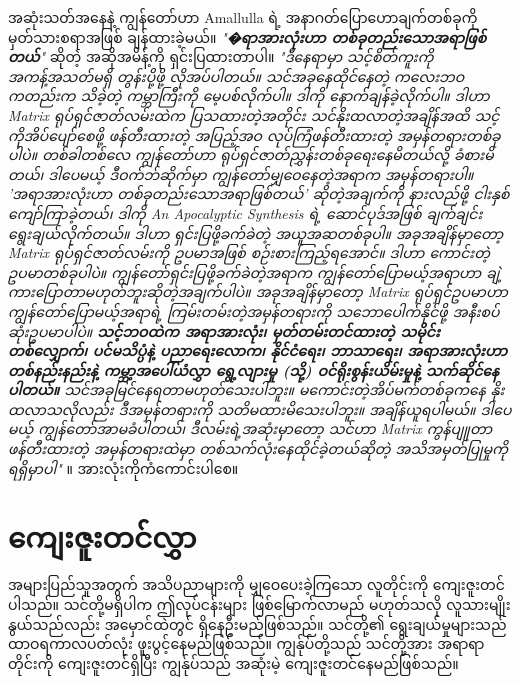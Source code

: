 \documentclass[10pt,twocolumn,letterpaper]{article}
\begin{document}
အဆုံးသတ်အနေနဲ့ ကျွန်တော်ဟာ Amallulla ရဲ့ အနာဂတ်ပြောဟောချက်တစ်ခုကို မှတ်သားစရာအဖြစ် ချန်ထားခဲ့မယ်။ \textit{"\textbf{�ရာအားလုံးဟာ တစ်ခုတည်းသောအရာဖြစ်တယ်}"} ဆိုတဲ့ အဆိုအမိန့်ကို ရှင်းပြထားတာပါ။ \textit{"ဒီနေရာမှာ သင့်စိတ်ကူးကို အကန့်အသတ်မရှိ တွန်းပို့ဖို့ လိုအပ်ပါတယ်။ သင်အခုနေထိုင်နေတဲ့ ကလေးဘဝကတည်းက သိခဲ့တဲ့ ကမ္ဘာကြီးကို မေ့ပစ်လိုက်ပါ။ ဒါကို နောက်ချန်ခဲ့လိုက်ပါ။ ဒါဟာ Matrix ရုပ်ရှင်ဇာတ်လမ်းထဲက ပြသထားတဲ့အတိုင်း သင်နိုးထလာတဲ့အချိန်အထိ သင့်ကိုအိပ်ပျော်စေဖို့ ဖန်တီးထားတဲ့ အပြည့်အဝ လုပ်ကြံဖန်တီးထားတဲ့ အမှန်တရားတစ်ခုပါပဲ။ တစ်ခါတစ်လေ ကျွန်တော်ဟာ ရုပ်ရှင်ဇာတ်ညွှန်းတစ်ခုရေးနေမိတယ်လို့ ခံစားမိတယ်၊ ဒါပေမယ့် ဒီဝက်ဘ်ဆိုက်မှာ ကျွန်တော်မျှဝေနေတဲ့အရာက အမှန်တရားပါ။ 'အရာအားလုံးဟာ တစ်ခုတည်းသောအရာဖြစ်တယ်' ဆိုတဲ့အချက်ကို နားလည်ဖို့ ငါးနှစ်ကျော်ကြာခဲ့တယ်၊ ဒါကို An Apocalyptic Synthesis ရဲ့ ဆောင်ပုဒ်အဖြစ် ချက်ချင်းရွေးချယ်လိုက်တယ်။ ဒါဟာ ရှင်းပြဖို့ခက်ခဲတဲ့ အယူအဆတစ်ခုပါ။ အခုအချိန်မှာတော့ Matrix ရုပ်ရှင်ဇာတ်လမ်းကို ဥပမာအဖြစ် စဉ်းစားကြည့်ရအောင်။ ဒါဟာ ကောင်းတဲ့ ဥပမာတစ်ခုပါပဲ။ ကျွန်တော်ရှင်းပြဖို့ခက်ခဲတဲ့အရာက ကျွန်တော်ပြောမယ့်အရာဟာ ချဲ့ကားပြောတာမဟုတ်ဘူးဆိုတဲ့အချက်ပါပဲ။ အခုအချိန်မှာတော့ Matrix ရုပ်ရှင်ဥပမာဟာ ကျွန်တော်ပြောမယ့်အရာရဲ့ ကြမ်းတမ်းတဲ့အမှန်တရားကို သဘောပေါက်နိုင်ဖို့ အနီးစပ်ဆုံးဥပမာပါပဲ။ \textbf{သင့်ဘဝထဲက အရာအားလုံး၊ မှတ်တမ်းတင်ထားတဲ့ သမိုင်းတစ်လျှောက်၊ ပင်မသိပ္ပံနဲ့ ပညာရေးလောက၊ နိုင်ငံရေး၊ ဘာသာရေး၊ အရာအားလုံးဟာ တစ်နည်းနည်းနဲ့ ကမ္ဘာ့အပေါ်ယံလွှာ ရွေ့လျားမှု (သို့) ဝင်ရိုးစွန်းယိမ်းမှုနဲ့ သက်ဆိုင်နေပါတယ်။} သင်အခုမြင်နေရတာမဟုတ်သေးပါဘူး။ မကောင်းတဲ့အိပ်မက်တစ်ခုကနေ နိုးထလာသလိုလည်း ဒီအမှန်တရားကို သတိမထားမိသေးပါဘူး။ အချိန်ယူရပါမယ်။ ဒါပေမယ့် ကျွန်တော်အာမခံပါတယ်၊ ဒီလမ်းရဲ့အဆုံးမှာတော့ သင်ဟာ Matrix ကွန်ပျူတာဖန်တီးထားတဲ့ အမှန်တရားထဲမှာ တစ်သက်လုံးနေထိုင်ခဲ့တယ်ဆိုတဲ့ အသိအမှတ်ပြုမှုကို ရရှိမှာပါ"} \cite{33,34}။
အားလုံးကိုကံကောင်းပါစေ။

\section{ကျေးဇူးတင်လွှာ}

အများပြည်သူအတွက် အသိပညာများကို မျှဝေပေးခဲ့ကြသော လူတိုင်းကို ကျေးဇူးတင်ပါသည်။ သင်တို့မရှိပါက ဤလုပ်ငန်းများ ဖြစ်မြောက်လာမည် မဟုတ်သလို လူသားမျိုးနွယ်သည်လည်း အမှောင်ထဲတွင် ရှိနေဦးမည်ဖြစ်သည်။ သင်တို့၏ ရွေးချယ်မှုများသည် ထာဝရကာလပတ်လုံး ဖူးပွင့်နေမည်ဖြစ်သည်။ ကျွန်ုပ်တို့သည် သင်တို့အား အရာရာတိုင်းကို ကျေးဇူးတင်ရှိပြီး ကျွန်ုပ်သည် အဆုံးမဲ့ ကျေးဇူးတင်နေမည်ဖြစ်သည်။

\clearpage
\twocolumn

{\small
\renewcommand{\refname}{ကိုးကားချက်များ}


}
\end{document}
